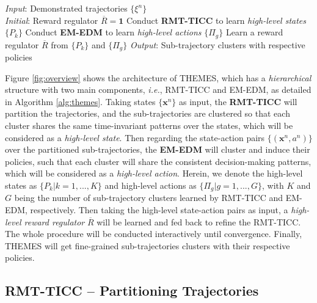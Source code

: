 \documentclass{article}
\begin{document}
\begin{algorithm}%
    \caption{\textbf{THEMES}}
    \label{alg:themes}
    \renewcommand{\thealgorithm}{}
    \begin{algorithmic}[1]
           \STATE \textit{Input}: Demonstrated trajectories $\{\xi^{n}\}$ \\ 
           \STATE \textit{Initial}: Reward regulator $\overline{R}=\mathbf{1}$
                \STATE Conduct \textbf{RMT-TICC} to learn
                \emph{high-level states} $\{P_{k}\}$
                \STATE Conduct \textbf{EM-EDM} to learn \emph{high-level actions} $\{\Pi_{g}\}$
                \STATE Learn a reward regulator $\overline{R}$ from $\{P_{k}\}$ and $\{\Pi_{g}\}$
            \ENDWHILE
            \STATE \textit{Output}: Sub-trajectory clusters with respective policies 
   \end{algorithmic}
\end{algorithm}


Figure \ref{fig:overview} shows the architecture of THEMES, which has a \emph{hierarchical} structure with two main components, \textit{i.e.}, RMT-TICC and EM-EDM, as detailed in Algorithm \ref{alg:themes}. 
Taking states $\{\mathbf{x}^{n}\}$ as input, the \textbf{RMT-TICC} will partition the trajectories, and the sub-trajectories are clustered so that each cluster shares the same time-invariant patterns over the states, which will be considered as a \emph{high-level state}. 
Then regarding the state-action pairs $\{(\mathbf{x}^{n}, a^{n})\}$ over the partitioned sub-trajectories, the \textbf{EM-EDM} will cluster and induce their policies, such that each cluster will share the consistent decision-making patterns, which will be considered as a \emph{high-level action}. 
Herein, we denote the high-level states as $\{P_{k}|k=1, ..., K\}$ and high-level actions as $\{\Pi_{g}|g=1, ..., G\}$, with $K$ and $G$ being the number of sub-trajectory clusters learned by RMT-TICC and EM-EDM, respectively. 
Then taking the high-level state-action pairs as input, a \emph{high-level reward regulator} $\overline{R}$ will be learned and fed back to refine the RMT-TICC. The whole procedure will be conducted interactively until convergence. Finally, THEMES will get fine-grained sub-trajectories clusters with their respective policies.


\subsection{RMT-TICC -- Partitioning Trajectories}
\end{document}
